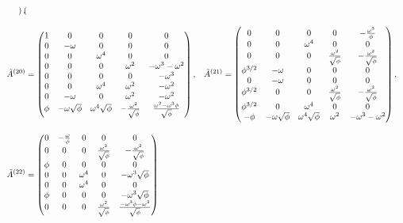 \begin{align}
\begin{pmatrix}
  \end{pmatrix}, \notag \\[2ex]
  \tilde{A}^{(20)} &= \begin{pmatrix}
    1 & 0 & 0 & 0 & 0 \\
    0 & -\omega & 0 & 0 & 0 \\
    0 & 0 & \omega^4 & 0 & 0 \\
    0 & 0 & 0 & \omega^2 & -\omega^3-\omega^2 \\
    0 & 0 & 0 & 0 & -\omega^3 \\
    0 & 0 & \omega^4 & \omega^2 & -\omega^2 \\
    0 & -\omega & 0 & \omega^2 & -\omega^2 \\
    \phi & -\omega\sqrt{\phi} & \omega^4 \sqrt{\phi} & -\frac{\omega^2}{\sqrt{\phi}} & \frac{\omega^2-\omega^3 \phi}{\sqrt{\phi}} \\
  \end{pmatrix}, &
  \tilde{A}^{(21)} &= \begin{pmatrix}
    0 & 0 & 0 & 0 & -\frac{\omega^3}{\phi} \\
    0 & 0 & \omega^4 & 0 & 0 \\
    0 & 0 & 0 & \frac{\omega^2}{\sqrt{\phi}} & -\frac{\omega^2}{\sqrt{\phi}} \\
    \phi^{3/2} & -\omega & 0 & 0 & 0 \\
    0 & -\omega & 0 & 0 & 0 \\
    \phi^{3/2} & 0 & 0 & \frac{\omega^2}{\sqrt{\phi}} & -\frac{\omega^2}{\sqrt{\phi}} \\
    \phi^{3/2} & 0 & \omega^4 & 0 & 0 \\
    -\phi & -\omega\sqrt{\phi} & \omega^4 \sqrt{\phi} & \omega^2 & -\omega^3-\omega^2 \\
  \end{pmatrix}, \notag \\[2ex]
  \tilde{A}^{(22)} &= \begin{pmatrix}
    0 & -\frac{\omega}{\phi} & 0 & 0 & 0 \\
    0 & 0 & 0 & \frac{\omega^2}{\sqrt{\phi}} & -\frac{\omega^2}{\sqrt{\phi}} \\
    \phi & 0 & 0 & 0 & 0 \\
    0 & 0 & \omega^4 & 0 & -\omega^3\sqrt{\phi} \\
    0 & 0 & \omega^4 & 0 & 0 \\
    \phi & 0 & 0 & 0 & -\omega^3\sqrt{\phi} \\
    0 & 0 & 0 & \frac{\omega^2}{\sqrt{\phi}} & \frac{-\omega^3\phi-\omega^2}{\sqrt{\phi}} \\

\end{pmatrix}
\end{align}
